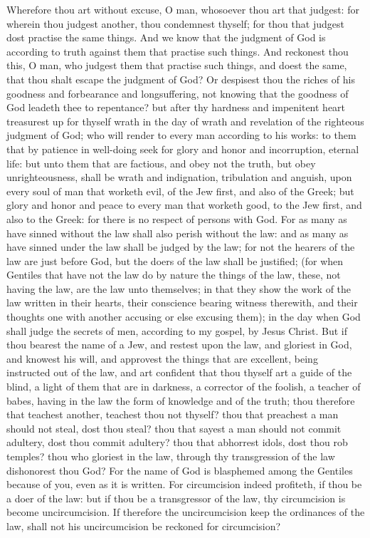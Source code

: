 Wherefore thou art without excuse, O man, whosoever thou art that judgest: for wherein thou judgest another, thou condemnest thyself; for thou that judgest dost practise the same things. And we know that the judgment of God is according to truth against them that practise such things. And reckonest thou this, O man, who judgest them that practise such things, and doest the same, that thou shalt escape the judgment of God? Or despisest thou the riches of his goodness and forbearance and longsuffering, not knowing that the goodness of God leadeth thee to repentance? but after thy hardness and impenitent heart treasurest up for thyself wrath in the day of wrath and revelation of the righteous judgment of God; who will render to every man according to his works: to them that by patience in well-doing seek for glory and honor and incorruption, eternal life: but unto them that are factious, and obey not the truth, but obey unrighteousness, shall be wrath and indignation, tribulation and anguish, upon every soul of man that worketh evil, of the Jew first, and also of the Greek; but glory and honor and peace to every man that worketh good, to the Jew first, and also to the Greek: for there is no respect of persons with God. For as many as have sinned without the law shall also perish without the law: and as many as have sinned under the law shall be judged by the law; for not the hearers of the law are just before God, but the doers of the law shall be justified; (for when Gentiles that have not the law do by nature the things of the law, these, not having the law, are the law unto themselves; in that they show the work of the law written in their hearts, their conscience bearing witness therewith, and their thoughts one with another accusing or else excusing them); in the day when God shall judge the secrets of men, according to my gospel, by Jesus Christ.  But if thou bearest the name of a Jew, and restest upon the law, and gloriest in God, and knowest his will, and approvest the things that are excellent, being instructed out of the law, and art confident that thou thyself art a guide of the blind, a light of them that are in darkness, a corrector of the foolish, a teacher of babes, having in the law the form of knowledge and of the truth; thou therefore that teachest another, teachest thou not thyself? thou that preachest a man should not steal, dost thou steal? thou that sayest a man should not commit adultery, dost thou commit adultery? thou that abhorrest idols, dost thou rob temples? thou who gloriest in the law, through thy transgression of the law dishonorest thou God? For the name of God is blasphemed among the Gentiles because of you, even as it is written. For circumcision indeed profiteth, if thou be a doer of the law: but if thou be a transgressor of the law, thy circumcision is become uncircumcision. If therefore the uncircumcision keep the ordinances of the law, shall not his uncircumcision be reckoned for circumcision? 